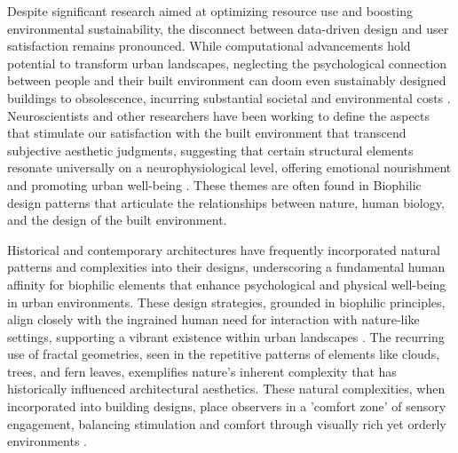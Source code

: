 Despite significant research aimed at optimizing resource use and boosting environmental sustainability, the disconnect between data-driven design and user satisfaction remains pronounced.
While computational advancements hold potential to transform urban landscapes, neglecting the psychological connection between people and their built environment can doom even sustainably designed buildings to obsolescence, incurring substantial societal and environmental costs \cite{Aesthetic2022}.
Neuroscientists and other researchers have been working to define the aspects that stimulate our satisfaction with the built environment that transcend subjective aesthetic judgments, suggesting that certain structural elements resonate universally on a neurophysiological level, offering emotional nourishment and promoting urban well-being \cite{Brielmann2022}.
These themes are often found in Biophilic design patterns that articulate the relationships between nature, human biology, and the design of the built environment.

Historical and contemporary architectures have frequently incorporated natural patterns and complexities into their designs, underscoring a fundamental human affinity for biophilic elements that enhance psychological and physical well-being in urban environments.
These design strategies, grounded in biophilic principles, align closely with the ingrained human need for interaction with nature-like settings, supporting a vibrant existence within urban landscapes \cite{Browning2014}.
The recurring use of fractal geometries, seen in the repetitive patterns of elements like clouds, trees, and fern leaves, exemplifies nature's inherent complexity that has historically influenced architectural aesthetics.
These natural complexities, when incorporated into building designs, place observers in a 'comfort zone' of sensory engagement, balancing stimulation and comfort through visually rich yet orderly environments \cite{Browning2014}.

